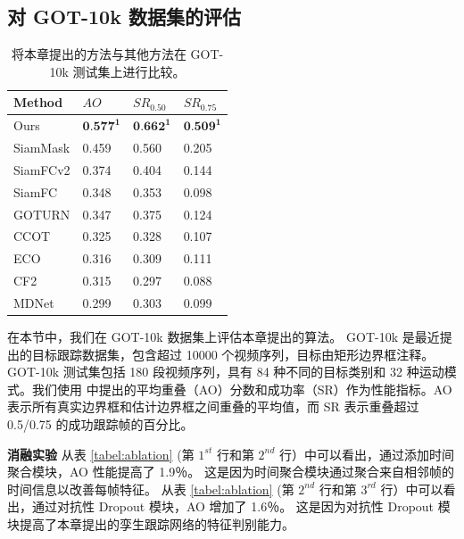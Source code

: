 \subsection{对 GOT-10k 数据集的评估}
\begin{table}[t]
\centering
\caption{将本章提出的方法与其他方法在 GOT-10k 测试集上进行比较。}
\begin{tabular}{l l l l}
\bottomrule
Method   &  $AO$   &  $SR_{0.50}$ & $SR_{0.75}$  \\
\hline
Ours &  $\textbf{0.577}^\textbf{1}$ & $\textbf{0.662}^\textbf{1}$  & $\textbf{0.509}^\textbf{1}$  \\
SiamMask &  0.459&  0.560 &0.205 \\
SiamFCv2 &  0.374&  0.404 &0.144 \\
SiamFC   &  0.348&  0.353 &0.098 \\
GOTURN	 &  0.347&  0.375 &0.124 \\
CCOT	 &  0.325&  0.328 &0.107 \\
ECO	     &  0.316&  0.309 &0.111 \\
CF2	     &  0.315&  0.297 &0.088 \\
MDNet	 &  0.299&  0.303 &0.099 \\
\bottomrule
\end{tabular}
\label{table:got}
\end{table}
在本节中，我们在 GOT-10k \cite{GOT-10k} 数据集上评估本章提出的算法。
GOT-10k 是最近提出的目标跟踪数据集，包含超过 10000 个视频序列，目标由矩形边界框注释。
GOT-10k 测试集包括 180 段视频序列，具有 84 种不同的目标类别和 32 种运动模式。我们使用 \cite{GOT-10k} 中提出的平均重叠（AO）分数和成功率（SR）作为性能指标。AO 表示所有真实边界框和估计边界框之间重叠的平均值，而 SR 表示重叠超过 0.5/0.75 的成功跟踪帧的百分比。

\textbf{消融实验}
从表 \ref{tabel:ablation} (第 $1^{st}$ 行和第 $2^{nd}$ 行）中可以看出，通过添加时间聚合模块，AO 性能提高了 1.9％。
这是因为时间聚合模块通过聚合来自相邻帧的时间信息以改善每帧特征。
从表 \ref{tabel:ablation} (第 $2^{nd}$ 行和第 $3^{rd}$ 行）中可以看出，通过对抗性 Dropout 模块，AO 增加了 1.6％。
这是因为对抗性 Dropout 模块提高了本章提出的孪生跟踪网络的特征判别能力。

